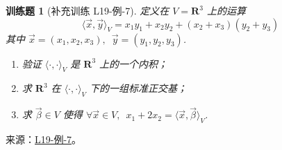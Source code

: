 \documentclass[12pt,fontset=fandol]{ctexart}
\newtheorem{exercise}{训练题}[section]
\begin{document}
\begin{exercise}[补充训练 L19-例-7]\label{prob:L19-例-7}
定义在 $ V = \mathbf{R}^3 $ 上的运算
    \[ \langle \vec{x}, \vec{y} \rangle_V = x_1 y_1 + x_2 y_2 + (x_2 + x_3)(y_2 + y_3) \]
    其中 $ \vec{x} = (x_1, x_2, x_3),\enspace \vec{y} = (y_1, y_2, y_3) $.
    \begin{enumerate}
        \item 验证 $ \langle \cdot, \cdot \rangle_V $ 是 $ \mathbf{R}^3 $ 上的一个内积；

        \item 求 $ \mathbf{R}^3 $ 在 $ \langle \cdot, \cdot \rangle_V $ 下的一组标准正交基；

        \item 求 $ \vec{\beta} \in V $ 使得 $ \forall \vec{x} \in V,\enspace x_1 + 2x_2 = \langle \vec{x}, \vec{\beta} \rangle_V $.
    \end{enumerate}
\end{exercise}
\noindent 来源：\href{https://github.com/yhwu-is/Linear-Algebra-Left-Undone/blob/new/%E8%AE%B2%E4%B9%89/%E4%B8%93%E9%A2%98/19%20%E5%86%85%E7%A7%AF%E7%A9%BA%E9%97%B4.tex}{L19-例-7}。
\end{document}
